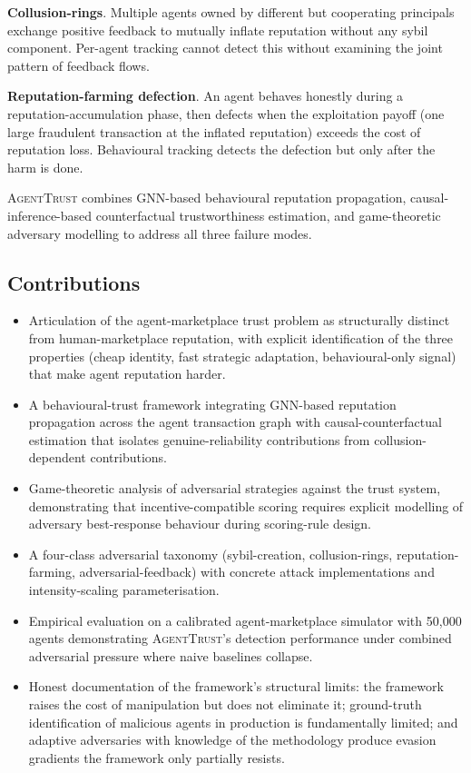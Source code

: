 \documentclass[sigconf,nonacm]{acmart}
\begin{document}
\textbf{Collusion-rings}. Multiple agents owned by different but
cooperating principals exchange positive feedback to mutually inflate
reputation without any sybil component. Per-agent tracking cannot
detect this without examining the joint pattern of feedback flows.

\textbf{Reputation-farming defection}. An agent behaves honestly
during a reputation-accumulation phase, then defects when the
exploitation payoff (one large fraudulent transaction at the
inflated reputation) exceeds the cost of reputation loss. Behavioural
tracking detects the defection but only after the harm is done.

\textsc{AgentTrust} combines GNN-based behavioural reputation
propagation, causal-inference-based counterfactual trustworthiness
estimation, and game-theoretic adversary modelling to address all
three failure modes.

\subsection{Contributions}

\begin{itemize}
  \item Articulation of the agent-marketplace trust problem as
        structurally distinct from human-marketplace reputation, with
        explicit identification of the three properties (cheap
        identity, fast strategic adaptation, behavioural-only signal)
        that make agent reputation harder.
  \item A behavioural-trust framework integrating GNN-based
        reputation propagation across the agent transaction graph
        with causal-counterfactual estimation that isolates
        genuine-reliability contributions from collusion-dependent
        contributions.
  \item Game-theoretic analysis of adversarial strategies against
        the trust system, demonstrating that incentive-compatible
        scoring requires explicit modelling of adversary best-response
        behaviour during scoring-rule design.
  \item A four-class adversarial taxonomy (sybil-creation,
        collusion-rings, reputation-farming, adversarial-feedback)
        with concrete attack implementations and intensity-scaling
        parameterisation.
  \item Empirical evaluation on a calibrated agent-marketplace
        simulator with 50{,}000 agents demonstrating
        \textsc{AgentTrust}'s detection performance under combined
        adversarial pressure where naive baselines collapse.
  \item Honest documentation of the framework's structural limits:
        the framework raises the cost of manipulation but does not
        eliminate it; ground-truth identification of malicious agents
        in production is fundamentally limited; and adaptive
        adversaries with knowledge of the methodology produce
        evasion gradients the framework only partially resists.
\end{itemize}
\end{document}
